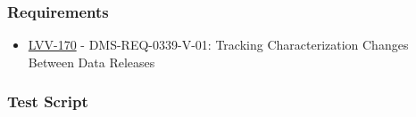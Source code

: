 \hypertarget{requirements-59}{%
\subsubsection{Requirements}\label{requirements-59}}

\begin{itemize}
\tightlist
\item
  \href{https://jira.lsstcorp.org/browse/LVV-170}{LVV-170} -
  DMS-REQ-0339-V-01: Tracking Characterization Changes Between Data
  Releases
\end{itemize}

\hypertarget{test-script-59}{%
\subsubsection{Test Script}\label{test-script-59}}

